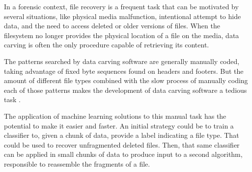     
In a forensic context, file recovery is a frequent task that can be motivated by several situations, like physical media malfunction, intentional attempt to hide data, and the need to access deleted or older versions of files. When the filesystem no longer provides the physical location of a file on the media, data carving is often the only procedure capable of retrieving its content.


The patterns searched by data carving software are generally manually coded, taking advantage of fixed byte sequences found on headers and footers. But the amount of different file types combined with the slow process of manually coding each of those patterns makes the development of data carving software a tedious task \cite{mcdaniel_content_2003}.

The application of machine learning solutions to this manual task has the potential to make it easier and faster. An initial strategy could be to train a classifier to, given a chunk of data, provide a label indicating a file type. That could be used to recover unfragmented deleted files.
Then, that same classifier can be applied in small chunks of data to produce input to a second algorithm, responsible to reassemble the fragments of a file.

